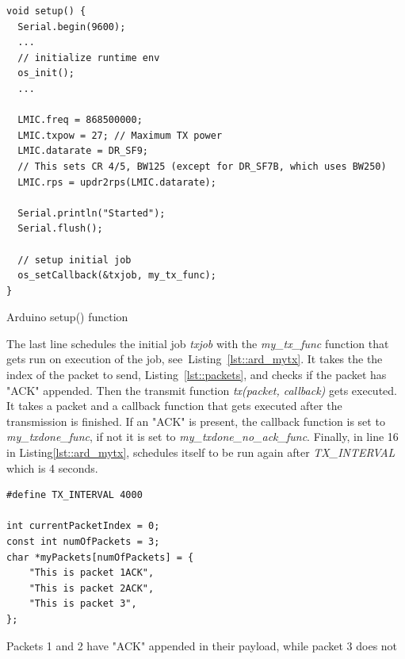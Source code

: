 \begin{listing}[h]
    \begin{verbatim}
void setup() {
  Serial.begin(9600);
  ...
  // initialize runtime env
  os_init();
  ...
  
  LMIC.freq = 868500000;
  LMIC.txpow = 27; // Maximum TX power
  LMIC.datarate = DR_SF9;
  // This sets CR 4/5, BW125 (except for DR_SF7B, which uses BW250)
  LMIC.rps = updr2rps(LMIC.datarate);

  Serial.println("Started");
  Serial.flush();

  // setup initial job
  os_setCallback(&txjob, my_tx_func);
}
    \end{verbatim}
    \caption{Arduino setup() function}
    \label{lst::ard_setup}
    
\end{listing}

The last line schedules the initial job \emph{txjob} with the \emph{my\_tx\_func} function that gets run
on execution of the job, see~Listing~\ref{lst::ard_mytx}. It takes the the index of the packet to send, Listing~\ref{lst::packets}, and
checks if the packet has "ACK" appended. Then the transmit function \emph{tx(packet, callback)} gets executed. 
It takes a packet and a callback function that gets executed after the transmission is finished. 
If an "ACK" is present, the callback function is set to \emph{my\_txdone\_func}, if not it is set to \emph{my\_txdone\_no\_ack\_func}.
Finally, in line 16 in Listing\ref{lst::ard_mytx}, schedules itself to be run again after \emph{TX\_INTERVAL} which is 4 seconds.


\begin{listing}[h]
    \begin{verbatim}
#define TX_INTERVAL 4000

int currentPacketIndex = 0;
const int numOfPackets = 3;
char *myPackets[numOfPackets] = {
    "This is packet 1ACK", 
    "This is packet 2ACK", 
    "This is packet 3",
};
    \end{verbatim}
    \caption{Packets 1 and 2 have "ACK" appended in their payload, while packet 3 does not}
    \label{lst::packets}
    
\end{listing}


